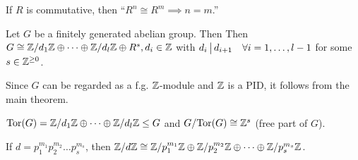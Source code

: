 \begin{remark}
  If $R$ is commutative, then ``$R^n \cong R^m \implies n = m$.''
\end{remark}

\begin{theorem}
  Let $G$ be a finitely generated abelian group. Then
  Then $G \cong {\mathbb{Z}}/{d_1 \mathbb{Z}} \oplus \dots \oplus {\mathbb{Z}}/{d_l \mathbb{Z}}
  \oplus R^s, d_i \in \mathbb{Z}$ with $d_i \,\big|\, d_{i+1} \quad
  \forall i = 1, \dots, l-1$ for some $s \in \mathbb{Z}^{\ge 0}$.

  Since $G$ can be regarded as a f.g. $\mathbb{Z}$-module and $\mathbb{Z}$ is a PID,
  it follows from the main theorem.

  $\operatorname{Tor}(G) = {\mathbb{Z}}/{d_1 \mathbb{Z}} \oplus \dots \oplus {\mathbb{Z}}/{d_l \mathbb{Z}}
  \le G$ and ${G}/{\operatorname{Tor}(G)} \cong \mathbb{Z}^s$ (free part of $G$).
\end{theorem}

\begin{fact}
  If $d = p_1^{m_1}p_2^{m_2}\dots p_s^{m_s}$, then
  ${\mathbb{Z}}/{d\mathbb{Z}} \cong {\mathbb{Z}}/{p_1^{m_1}\mathbb{Z}} \oplus
  {\mathbb{Z}}/{p_2^{m_2}\mathbb{Z}} \oplus \dots \oplus {\mathbb{Z}}/{p_s^{m_s}\mathbb{Z}}$.
\end{fact}

